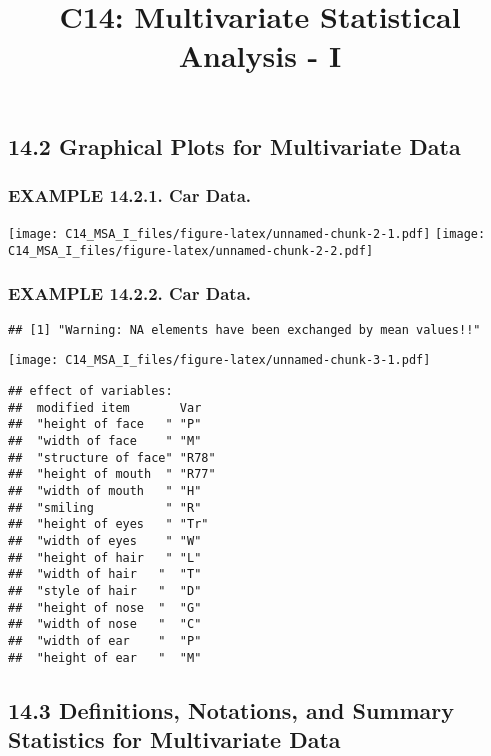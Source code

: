 \documentclass[]{article}
\title{C14: Multivariate Statistical Analysis - I}
\author{}
\date{}
\begin{document}
\maketitle

\hypertarget{graphical-plots-for-multivariate-data}{%
\subsection{14.2 Graphical Plots for Multivariate
Data}\label{graphical-plots-for-multivariate-data}}

\hypertarget{example-14.2.1.-car-data.}{%
\subsubsection{EXAMPLE 14.2.1. Car
Data.}\label{example-14.2.1.-car-data.}}

\texttt{[image: C14\_MSA\_I\_files/figure-latex/unnamed-chunk-2-1.pdf]}
\texttt{[image: C14\_MSA\_I\_files/figure-latex/unnamed-chunk-2-2.pdf]}

\hypertarget{example-14.2.2.-car-data.}{%
\subsubsection{EXAMPLE 14.2.2. Car
Data.}\label{example-14.2.2.-car-data.}}

\begin{verbatim}
## [1] "Warning: NA elements have been exchanged by mean values!!"
\end{verbatim}

\texttt{[image: C14\_MSA\_I\_files/figure-latex/unnamed-chunk-3-1.pdf]}

\begin{verbatim}
## effect of variables:
##  modified item       Var  
##  "height of face   " "P"  
##  "width of face    " "M"  
##  "structure of face" "R78"
##  "height of mouth  " "R77"
##  "width of mouth   " "H"  
##  "smiling          " "R"  
##  "height of eyes   " "Tr" 
##  "width of eyes    " "W"  
##  "height of hair   " "L"  
##  "width of hair   "  "T"  
##  "style of hair   "  "D"  
##  "height of nose  "  "G"  
##  "width of nose   "  "C"  
##  "width of ear    "  "P"  
##  "height of ear   "  "M"
\end{verbatim}

\hypertarget{definitions-notations-and-summary-statistics-for-multivariate-data}{%
\subsection{14.3 Definitions, Notations, and Summary Statistics for
Multivariate
Data}\label{definitions-notations-and-summary-statistics-for-multivariate-data}}
\end{document}
